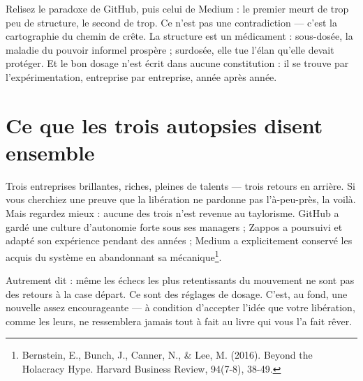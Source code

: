 Relisez le paradoxe de GitHub, puis celui de Medium : le premier meurt de trop peu de structure, le second de trop. Ce n'est pas une contradiction — c'est la cartographie du chemin de crête. La structure est un médicament : sous-dosée, la maladie du pouvoir informel prospère ; surdosée, elle tue l'élan qu'elle devait protéger. Et le bon dosage n'est écrit dans aucune constitution : il se trouve par l'expérimentation, entreprise par entreprise, année après année.

\section{Ce que les trois autopsies disent ensemble}

Trois entreprises brillantes, riches, pleines de talents — trois retours en arrière. Si vous cherchiez une preuve que la libération ne pardonne pas l'à-peu-près, la voilà. Mais regardez mieux : aucune des trois n'est revenue au taylorisme. GitHub a gardé une culture d'autonomie forte sous ses managers ; Zappos a poursuivi et adapté son expérience pendant des années ; Medium a explicitement conservé les acquis du système en abandonnant sa mécanique\footnote{Bernstein, E., Bunch, J., Canner, N., \& Lee, M. (2016). Beyond the Holacracy Hype. Harvard Business Review, 94(7-8), 38-49.}.

Autrement dit : même les échecs les plus retentissants du mouvement ne sont pas des retours à la case départ. Ce sont des réglages de dosage. C'est, au fond, une nouvelle assez encourageante — à condition d'accepter l'idée que votre libération, comme les leurs, ne ressemblera jamais tout à fait au livre qui vous l'a fait rêver.
